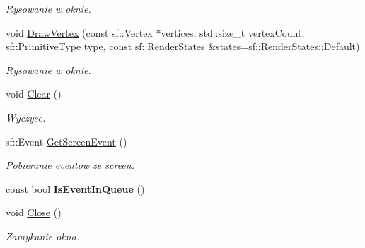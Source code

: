 \begin{DoxyCompactItemize}
\begin{DoxyCompactList}\small\item\em Rysowanie w oknie. \end{DoxyCompactList}\item 
\mbox{\label{classtfp_1_1_screen_a137bcd621d06eae9a53d743f8c6ad135}} 
void \mbox{\hyperlink{classtfp_1_1_screen_a137bcd621d06eae9a53d743f8c6ad135}{Draw\+Vertex}} (const sf\+::\+Vertex $\ast$vertices, std\+::size\+\_\+t vertex\+Count, sf\+::\+Primitive\+Type type, const sf\+::\+Render\+States \&states=sf\+::\+Render\+States\+::\+Default)
\begin{DoxyCompactList}\small\item\em Rysowanie w oknie. \end{DoxyCompactList}\item 
\mbox{\label{classtfp_1_1_screen_a9c1b0e49638812235f547e5c6c8b4789}} 
void \mbox{\hyperlink{classtfp_1_1_screen_a9c1b0e49638812235f547e5c6c8b4789}{Clear}} ()
\begin{DoxyCompactList}\small\item\em Wyczysc. \end{DoxyCompactList}\item 
\mbox{\label{classtfp_1_1_screen_a6ca9681484ed2c404beb13c437138676}} 
sf\+::\+Event \mbox{\hyperlink{classtfp_1_1_screen_a6ca9681484ed2c404beb13c437138676}{Get\+Screen\+Event}} ()
\begin{DoxyCompactList}\small\item\em Pobieranie eventow ze screen. \end{DoxyCompactList}\item 
\mbox{\label{classtfp_1_1_screen_a9f224862fc68528caa4cc1f5fb73f013}} 
const bool {\bfseries Is\+Event\+In\+Queue} ()
\item 
\mbox{\label{classtfp_1_1_screen_a11e80d123390d4713b4b7ba49a5af393}} 
void \mbox{\hyperlink{classtfp_1_1_screen_a11e80d123390d4713b4b7ba49a5af393}{Close}} ()
\begin{DoxyCompactList}\small\item\em Zamykanie okna. \end{DoxyCompactList}\item 
\mbox{\label{classtfp_1_1_screen_aa27dec08639e5aadcdce2af3674db316}} 

\end{DoxyCompactItemize}

